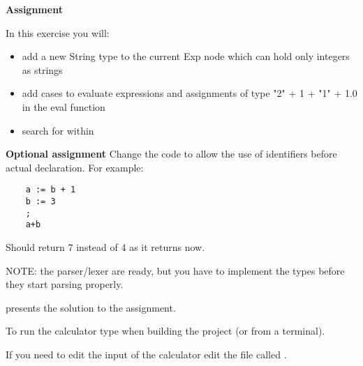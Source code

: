 {\bf Assignment}

In this exercise you will:
\begin{itemize}
\item add a new String type to the current Exp node which can hold only integers as strings 
\item add cases to evaluate expressions and assignments of type "2" + 1 + "1" + 1.0 in the eval function
\item search for  within 
\end{itemize}

{\bf Optional assignment}
Change the code to allow the use of identifiers before actual declaration.
For example:
\begin{verbatim}
	a := b + 1
	b := 3
	;
	a+b
\end{verbatim}
Should return 7 instead of 4 as it returns now.

NOTE: the parser/lexer are ready, but you have to implement the types
before they start parsing  properly.

 presents the solution to the assignment.

To run the calculator type  when building the project (or  from a terminal).

If you need to edit the input of the calculator edit the file called .
